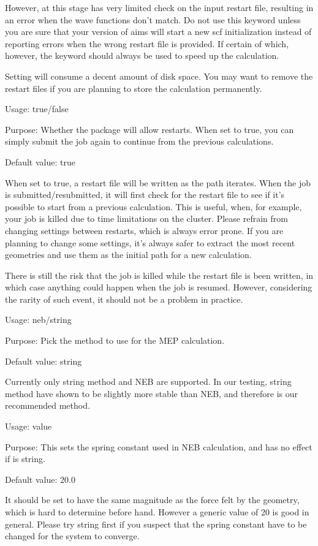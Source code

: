 However, at this stage  has very limited check on the input restart file, resulting in an error when the wave functions don't match. Do not use this keyword unless you are sure that your version of aims will start a new scf initialization instead of reporting errors when the wrong restart file is provided. If certain of which, however, the keyword should always be used to speed up the calculation. 

Setting  will consume a decent amount of disk space. You may want to remove the restart files if you are planning to store the calculation permanently.


{
Usage:  true/false


Purpose: Whether the package will allow restarts. When set to true, you can simply submit the job again to continue from the previous calculations. 

Default value: true
}
When set to true, a restart file will be written as the path iterates. When the job is submitted/resubmitted, it will first check for the restart file to see if it's possible to start from a previous calculation. This is useful, when, for example, your job is killed due to time limitations on the cluster. Please refrain from changing settings between restarts, which is always error prone. If you are planning to change some settings, it's always safer to extract the most recent geometries and use them as the initial path for a new calculation. 

There is still the risk that the job is killed while the restart file is been written, in which case anything could happen when the job is resumed. However, considering the rarity of such event, it should not be a problem in practice.  

{
Usage:  neb/string


Purpose: Pick the method to use for the MEP calculation. 


Default value: string
}
Currently only string method and NEB are supported. In our testing, string method have shown to be slightly more stable than NEB, and therefore is our recommended method. 
{
Usage:  value 


Purpose: This sets the spring constant used in NEB calculation, and has no effect if  is string. 

Default value: 20.0
}
It should be set to have the same magnitude as the force felt by the geometry, which is hard to determine before hand. However a generic value of 20 is good in general. Please try  string first if you suspect that the spring constant have to be changed for the system to converge. 

